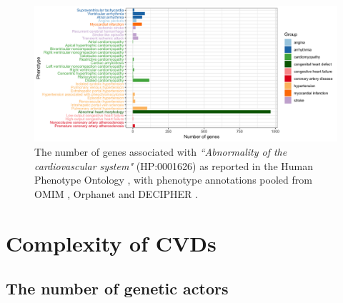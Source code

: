 \documentclass[letter]{bioinfo}
\begin{document}
		\begin{figure}[!tpb]
		\includegraphics[width=1.\linewidth]{hpo-gene-count}
		\caption{The number of genes associated with \emph{``Abnormality of the cardiovascular system"} (HP:0001626) as reported in the Human Phenotype Ontology \citep{Kohler:2014:Human},
			 with phenotype annotations pooled from OMIM \citep{McKusick:2018:OMIM} , Orphanet \citep{INSERM:1997:Orphanet}  and DECIPHER \citep{Firth:2009:DECIPHER}.}
		\label{fig:hpo_gene_count}	
	\end{figure}
	
	
	\section*{Complexity of CVDs}  %
	\subsection*{The number of genetic actors}
	
\end{document}

